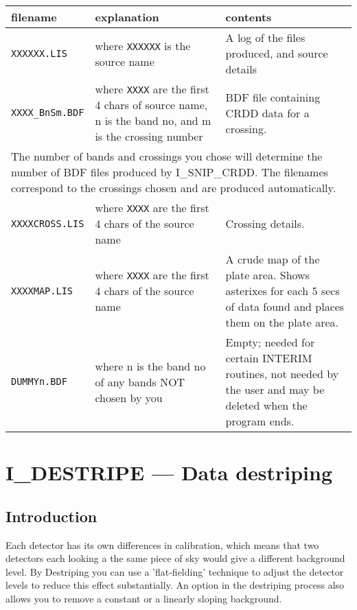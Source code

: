 \documentclass[nolof,noabs,11pt]{starlink}
\begin{document}
\begin{tabular}{lp{1.8in}p{2.9in}}
filename & explanation & contents \\ \hline

\texttt{XXXXXX.LIS} & where \texttt{XXXXXX} is the source name & A log of the files
produced, and source details \\

\texttt{XXXX\_BnSm.BDF} & where \texttt{XXXX} are the first 4 chars of source name,
n is the band no, and m is the crossing number & BDF file containing
CRDD data for a crossing. \\

\multicolumn{3}{p{\textwidth}}{The number of bands and crossings you chose will determine the number of BDF
files  produced by I\_SNIP\_CRDD. The filenames correspond to the crossings
chosen and are produced automatically.} \\

\texttt{XXXXCROSS.LIS} & where \texttt{XXXX} are the first 4 chars of the
source name & Crossing details. \\

\texttt{XXXXMAP.LIS} & where \texttt{XXXX} are the first 4 chars of the source name & A crude
map of the plate area.
Shows asterixes for each 5 secs of data found and places them on the plate
area.\\

\texttt{DUMMYn.BDF} & where n is the band no of any bands NOT chosen by you & Empty;
needed for certain INTERIM routines, not needed by the user and may be
deleted when the program ends. \\
\end{tabular}

\pagebreak
\section {I\_DESTRIPE --- Data destriping}

\subsection {Introduction}

Each detector has its own differences in calibration, which means that two
detectors each looking a the same piece of sky would give a different background
level. By Destriping you can use a 'flat-fielding' technique  to adjust the
detector levels to reduce this effect substantially. An option in the
destriping process also allows you to remove a constant or a linearly sloping
background.
\end{document}
